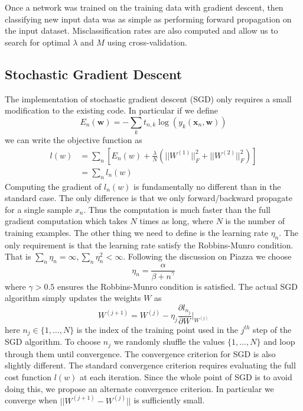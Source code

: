 \documentclass[10pt]{article}
\begin{document}
Once a network was trained on the training data with gradient descent, then classifying new input data was as simple as performing forward propagation on the input dataset.  Misclassification rates are also computed and allow us to search for optimal $\lambda$ and $M$ using cross-validation.

\subsection*{Stochastic Gradient Descent}
The implementation of stochastic gradient descent (SGD) only requires a small modification to the existing code. In particular if we define
%
%
\begin{equation}
E_n(\mathbf{w}) = -\sum_k t_{n,k} \log(y_k(\mathbf{x}_n,\mathbf{w}))
\end{equation}
%
we can write the objective function as 
%
%
\begin{align}
l(w) &= \sum_n \left[ E_n(w) + \frac{\lambda}{N} (||W^{(1)}||^2_F + ||W^{(2)}||^2_F) \right] \\
& = \sum_n l_n(w)
\end{align}
%
%
Computing the gradient of $l_n(w)$ is fundamentally no different than in the standard case. The only difference is that we only forward/backward propagate for a single sample $x_n$. Thus the computation is much faster than the full gradient computation which takes $N$ times as long, where $N$ is the number of training examples. The other thing we need to define is the learning rate $\eta_n$. The only requirement is that the learning rate satisfy the Robbins-Munro condition. That is $\sum_n \eta_n = \infty, \sum_n \eta_n^2 < \infty$. Following the discussion on Piazza we choose
%
%
\begin{equation}
\eta_n = \frac{\alpha}{{\beta + n}^\gamma}
\end{equation}
%
%
where $\gamma > 0.5$ ensures the Robbins-Munro condition is satisfied. The actual SGD algorithm simply updates the weights $W$ as 
%
%
\begin{equation}
W^{(j+1)} = W^{(j)} - \eta_j \frac{\partial l_{n_j}}{\partial W}|_{W^{(j)}}
\end{equation}
%
%
here $n_j \in \{1,\ldots,N\}$ is the index of the training point used in the $j^{th}$ step of the SGD algorithm. To choose $n_j$ we randomly shuffle the values $\{1,\ldots,N\}$ and loop through them until convergence. The convergence criterion for SGD is also slightly different. The standard convergence criterion requires evaluating the full cost function $l(w)$ at each iteration. Since the whole point of SGD is to avoid doing this, we propose an alternate convergence criterion. In particular we converge when $||W^{(j+1)} - W^{(j)}||$ is sufficiently small. 
\end{document}

